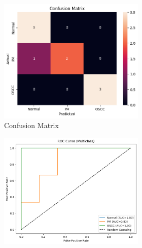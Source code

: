 \documentclass[a4paper,12pt]{article}
\begin{document}
\begin{figure}[H]
	\begin{subfigure}[b]{0.45\textwidth}
		\centering
		\begin{subfigure}[b]{0.49\textwidth}
			\centering
			\includegraphics[width=\textwidth]{images/3lpc.png}  %
			\caption{Confusion Matrix}
			\label{fig:fig5}
		\end{subfigure}
		\hfill
		\begin{subfigure}[b]{0.49\textwidth}
			\centering
			\includegraphics[width=\textwidth]{images/3lpr.png}  %

\end{subfigure}
\end{subfigure}
\end{figure}
\end{document}
